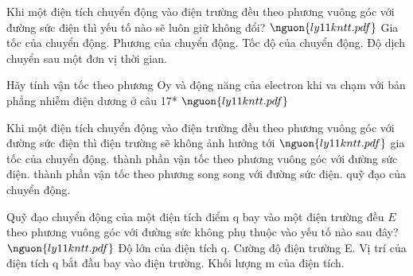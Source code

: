 \begin{ex}
Khi một điện tích chuyển động vào điện trường đều theo phương vuông góc với đường sức điện thì yếu tố nào sẽ luôn giữ không đổi? $\nguon{ly11 kntt.pdf}$
\choice
{\True Gia tốc của chuyển động.}
{Phương của chuyển động.}
{Tốc độ của chuyển động.}
{Độ dịch chuyển sau một đơn vị thời gian.}
\end{ex}

\begin{ex}
Hãy tính vận tốc theo phương Oy và động năng của electron khi va chạm với bản phẳng nhiễm điện dương ở câu 17* $\nguon{ly11 kntt.pdf}$
\choiceTF

\end{ex}

\begin{ex}
Khi một điện tích chuyển động vào điện trường đều theo phương vuông góc với đường sức điện thì điện trường sẽ không ảnh hưởng tới $\nguon{ly11 kntt.pdf}$
\choice
{gia tốc của chuyển động.}
{\True thành phần vận tốc theo phương vuông góc với đường sức điện.}
{thành phần vận tốc theo phương song song với đường sức điện.}
{quỹ đạo của chuyển động.}
\end{ex}

\begin{ex}
Quỹ đạo chuyển động của một điện tích điểm q bay vào một điện trường đều $E$ theo phương vuông góc với đường sức không phụ thuộc vào yếu tố nào sau đây? $\nguon{ly11 kntt.pdf}$
\choice
{Độ lớn của điện tích q.}
{Cường độ điện trường E.}
{\True Vị trí của điện tích q bắt đầu bay vào điện trường.}
{Khối lượng m của điện tích.}
\end{ex}
